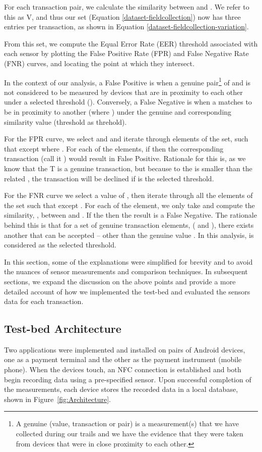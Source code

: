 \documentclass{article}
\begin{document}
For each transaction pair, we calculate the similarity between  and .  We refer to this as V, and thus our set (Equation \ref{dataset-fieldcollection}) now has three entries per transaction, as shown in Equation \ref{dataset-fieldcollection-variation}.



From this set, we compute the Equal Error Rate (EER) threshold associated with each sensor by plotting the False Positive Rate (FPR) and False Negative Rate (FNR) curves, and locating the point at which they intersect.  

In the context of our analysis, a False Positive is when a genuine pair\footnote{A genuine (value, transaction or pair) is a measurement(s) that we have collected during our trails and we have the evidence that they were taken from devices that were in close proximity to each other.} of  and  is not considered to be measured by devices that are in proximity to each other under a selected threshold ().  Conversely, a False Negative is when a  matches to be in proximity to another  (where ) under the genuine and corresponding similarity value  (threshold as threhold). 



For the FPR curve, we select  and  and iterate through  elements of the set, such that  except where .  For each of the  elements, if    then the corresponding transaction (call it ) would result in False Positive. Rationale for this is, as we know that the T is a genuine transaction, but because to the  is smaller than the related , the transaction will be declined if  is the selected threshold.

For the FNR curve we select a value of , then iterate through all the  elements of the set such that  except . For each of the  element, we only take  and compute the similarity, , between  and . If the    then the result is a False Negative. The rationale behind this is that for a set of genuine transaction elements, ( and ), there exists another  that can be accepted -- other than the genuine value .   In this analysis,  is considered as the selected threshold.

In this section, some of the explanations were simplified for brevity and to avoid the nuances of sensor measurements and comparison techniques. In subsequent sections, we expand the discussion on the above points and provide a more detailed account of how we implemented the test-bed and evaluated the sensors data for each transaction. 

\subsection{Test-bed Architecture}
\label{sec:Test-Bed_Architecture}
Two applications were implemented and installed on pairs of Android devices, one as a payment terminal and the other as the payment instrument (mobile phone).
When the devices touch, an NFC connection is established and both begin recording data using a pre-specified sensor.  Upon successful completion of the measurements, each device stores the recorded data in a local database, shown in Figure~\ref{fig:Architecture}.
\end{document}
